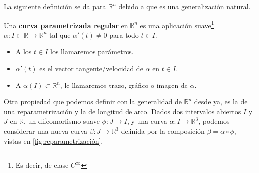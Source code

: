 \documentclass[oneside,11pt]{memoir}
\begin{document}
La siguiente definición se da para $\mathbb{R}^n$ debido a que es una generalización natural.
\begin{definition}
    Una \textbf{curva parametrizada regular} en $\mathbb{R}^n$ es una aplicación suave\footnote{Es decir, de clase $C^\infty$} $\alpha:I\subset \mathbb{R}\to \mathbb{R}^n$ tal que $\alpha'(t)\neq 0$ para todo $t\in I$.
    \begin{itemize}
        \item A los $t\in I$ los llamaremos parámetros.
        \item $\alpha'(t)$ es el vector tangente/velocidad de $\alpha$ en $t\in I$.
        \item A $\alpha(I)\subset \mathbb{R}^n$, le llamaremos trazo, gráfico o imagen de $\alpha$. 
    \end{itemize}
\end{definition}
Otra propiedad que podemos definir con la generalidad de $\mathbb{R}^n$ desde ya, es la de una reparametrización y la de longitud de arco. Dados dos intervalos abiertos $I$ y $J$ en $\mathbb{R}$, un difeomorfismo suave $\phi: J \to I$, y una curva $\alpha : I \to \mathbb{R}^3$, podemos considerar una nueva curva $\beta: J \to \mathbb{R}^3$ definida por
la composición $\beta = \alpha \circ\phi$, vistas en \ref{fig:reparametrización}.
\end{document}
